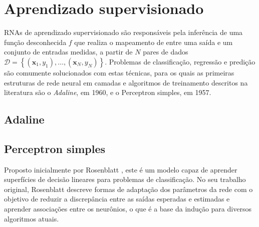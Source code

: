 \documentclass[conference]{IEEEtran}
\begin{document}
%
%
	
	\section{Aprendizado supervisionado}
	RNAs de aprendizado supervisionado são responsáveis pela inferência de uma função desconhecida $f$ que realiza o mapeamento de entre uma saída e um conjunto de entradas medidas, a partir de $N$ pares de dados $\mathcal{D} = \left\lbrace (\mathbf{x}_1, y_1), \dots, (\mathbf{x}_N, y_N)\right\rbrace $. Problemas de classificação, regressão e predição são comumente solucionados com estas técnicas, para os quais as primeiras estruturas de rede neural em camadas e algoritmos de treinamento descritos na literatura são o \textit{Adaline}, em 1960, e o Perceptron simples, em 1957. 

	\subsection{Adaline}	


	\subsection{Perceptron simples}
	Proposto inicialmente por Rosenblatt \cite{rosenblatt1957perceptron}, este é um modelo capaz de aprender  superfícies de decisão lineares para problemas de classificação. No seu trabalho original, Rosenblatt descreve formas de adaptação dos parâmetros da rede com o objetivo de reduzir a discrepância entre as saídas esperadas e estimadas e aprender associações entre os neurônios, o que é a base da indução para diversos algoritmos atuais.
	
\end{document}

